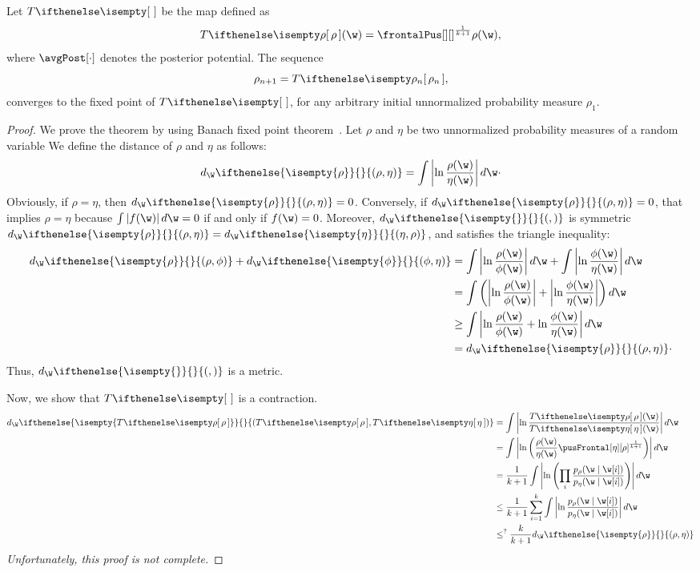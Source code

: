 \begin{theorem}
    Let $\fpMap{}$ be the map defined as
    \begin{equation*}
        \fpMap{\unnorm}(\w) = \frontalPus[][ ]^{\frac{1}{k+1}} \unnorm(\w),
    \end{equation*}
    where $\avgPost[\cdot]$ denotes the posterior potential.
    The sequence \[\rho_{n+1} = \fpMap{\rho_n},\] converges to the fixed point of
    $\fpMap{}$, for any arbitrary initial unnormalized probability measure $\rho_1$.
\end{theorem}

\begin{proof}
    \renewcommand{\d}[2]{d_{\W} \ifthenelse{\isempty{#1}}{}{\left( #1, #2 \right)}}
    \newcommand{\dExpand}[2]{\intAbs{\lnfrac{#1}{#2}}}
    \newcommand{\lnfrac}[2]{\ln \frac{#1(\w)}{#2(\w)}}
    \newcommand{\intAbs}[1]{\int \left| #1 \right| d\w}
    \newcommand{\p}{\rho}
    \newcommand{\q}{\eta}
    \renewcommand{\r}{\phi}
    We prove the theorem by using Banach fixed point theorem~\cite{Agarwal2018}.
    Let $\p$ and $\q$ be two unnormalized probability measures of a random variable \w
    We define the distance of $\p$ and $\q$ as follows:
    \begin{equation}
        \d{\p}{\q} = \dExpand{\p}{\q} \cdot
        \label{eq:d_metric}
    \end{equation}
    Obviously, if $\p = \q$, then $\d{\p}{\q} = 0$.
    Conversely, if $\d{\p}{\q} = 0$, that implies  $\p = \q$ because $\intAbs{f(\w)} = 0$ if and only if $f(\w) = 0$.
    Moreover, $\d{}{}$ is symmetric $\d{\p}{\q} = \d{\q}{\p}$, and satisfies the triangle inequality:
    \begin{align*}
        \d{\p}{\r} + \d{\r}{\q} &= \dExpand{\p}{\r} + \dExpand{\r}{\q} \\
        &= \int \left( \left| \lnfrac{\p}{\r} \right| + \left| \lnfrac{\r}{\q} \right| \right) d\w \\
        &\geq \intAbs{\lnfrac{\p}{\r} + \lnfrac{\r}{\q}} \\
        &= \d{\p}{\q} \cdot
    \end{align*}
    Thus, $\d{}{}$ is a metric.

    Now, we show that $\fpMap{}$ is a contraction.
    \begin{align*}
        \d{\fpMap{\p}}{\fpMap{\q}} &= \dExpand{\fpMap{\p}}{\fpMap{\q}} \\
        &= \intAbs{ \ln \left( \frac{\p(\w)}{\q(\w)} \pusFrontal[\q][\p]^{\frac{1}{k+1}} \right) }\\
        &= \frac{1}{k+1} \intAbs{ \ln \left( \prod_i \frac{p_{\p}(\w \mid \w[i])}{p_{\q}(\w \mid \w[i])} \right)} \\
        &\leq \frac{1}{k+1} \sum_{i=1}^{k} \intAbs{\ln \frac{p_{\p}(\w \mid \w[i])}{p_{\q}(\w \mid \w[i])}} \\
        &\leq^{?} \frac{k}{k+1} \d{\p}{\q}
    \end{align*}
    \emph{Unfortunately, this proof is not complete.}
\end{proof}

